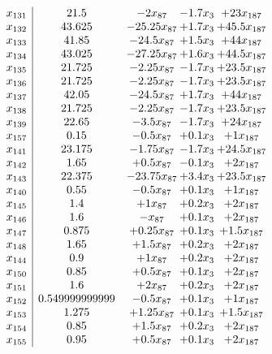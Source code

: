 \documentclass[11pt]{article}
\begin{document}
\[\begin{array}{c| c c@{\hskip 2pt} c@{\hskip 2pt} c@{\hskip 2pt} }
 x_{131}   &  21.5 & -2 x_{87} & -1.7 x_{3} & + 23 x_{187}\\
 x_{132}   &  43.625 & -25.25 x_{87} & + 1.7 x_{3} & + 45.5 x_{187}\\
 x_{133}   &  41.85 & -24.5 x_{87} & + 1.5 x_{3} & + 44 x_{187}\\
 x_{134}   &  43.025 & -27.25 x_{87} & + 1.6 x_{3} & + 44.5 x_{187}\\
 x_{135}   &  21.725 & -2.25 x_{87} & -1.7 x_{3} & + 23.5 x_{187}\\
 x_{136}   &  21.725 & -2.25 x_{87} & -1.7 x_{3} & + 23.5 x_{187}\\
 x_{137}   &  42.05 & -24.5 x_{87} & + 1.7 x_{3} & + 44 x_{187}\\
 x_{138}   &  21.725 & -2.25 x_{87} & -1.7 x_{3} & + 23.5 x_{187}\\
 x_{139}   &  22.65 & -3.5 x_{87} & -1.7 x_{3} & + 24 x_{187}\\
 x_{157}   &  0.15 & -0.5 x_{87} & + 0.1 x_{3} & + 1 x_{187}\\
 x_{141}   &  23.175 & -1.75 x_{87} & -1.7 x_{3} & + 24.5 x_{187}\\
 x_{142}   &  1.65 & + 0.5 x_{87} & -0.1 x_{3} & + 2 x_{187}\\
 x_{143}   &  22.375 & -23.75 x_{87} & + 3.4 x_{3} & + 23.5 x_{187}\\
 x_{140}   &  0.55 & -0.5 x_{87} & + 0.1 x_{3} & + 1 x_{187}\\
 x_{145}   &  1.4 & + 1 x_{87} & + 0.2 x_{3} & + 2 x_{187}\\
 x_{146}   &  1.6 & - x_{87} & + 0.1 x_{3} & + 2 x_{187}\\
 x_{147}   &  0.875 & + 0.25 x_{87} & + 0.1 x_{3} & + 1.5 x_{187}\\
 x_{148}   &  1.65 & + 1.5 x_{87} & + 0.2 x_{3} & + 2 x_{187}\\
 x_{144}   &  0.9 & + 1 x_{87} & + 0.2 x_{3} & + 2 x_{187}\\
 x_{150}   &  0.85 & + 0.5 x_{87} & + 0.1 x_{3} & + 2 x_{187}\\
 x_{151}   &  1.6 & + 2 x_{87} & + 0.2 x_{3} & + 2 x_{187}\\
 x_{152}   &  0.549999999999 & -0.5 x_{87} & + 0.1 x_{3} & + 1 x_{187}\\
 x_{153}   &  1.275 & + 1.25 x_{87} & + 0.1 x_{3} & + 1.5 x_{187}\\
 x_{154}   &  0.85 & + 1.5 x_{87} & + 0.2 x_{3} & + 2 x_{187}\\
 x_{155}   &  0.95 & + 0.5 x_{87} & + 0.1 x_{3} & + 2 x_{187}\\

\end{array}\]
\end{document}
